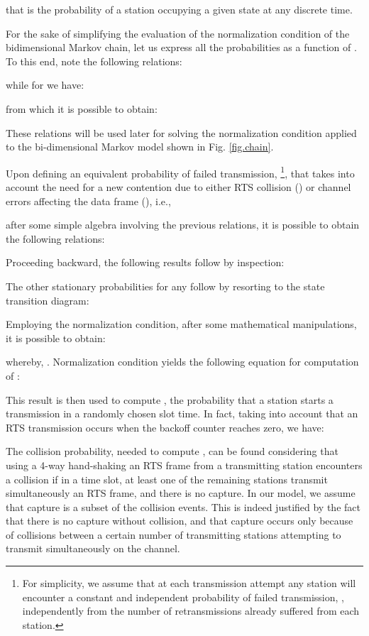 \documentclass[10pt,onecolumn,a4paper]{IEEEtran}
\begin{document}
that is the probability of a station occupying a given state at
any discrete time.

For the sake of simplifying the evaluation of the normalization
condition of the bidimensional Markov chain, let us express all
the probabilities  as a function of . To this
end, note the following relations:

while for  we have:

from which it is possible to obtain:

These relations will be used later for solving the normalization
condition applied to the bi-dimensional Markov model shown in Fig.
\ref{fig.chain}.

Upon defining an equivalent probability of failed transmission,
\footnote{For simplicity, we assume that at each
transmission attempt any station will encounter a constant and
independent probability of failed transmission, ,
independently from the number of retransmissions already suffered
from each station.}, that takes into account the need for a new
contention due to either RTS collision () or channel
errors affecting the data frame (), i.e.,

after some simple algebra involving the previous relations, it is
possible to obtain the following relations:

Proceeding backward, the following results follow by inspection:

The other stationary probabilities for any  follow
by resorting to the state transition diagram:

Employing the normalization condition, after some mathematical
manipulations, it is possible to obtain:

whereby, .
Normalization condition yields the following equation for
computation of :

This result is then used to compute , the probability that a
station starts a transmission in a randomly chosen slot time. In
fact, taking into account that an RTS transmission occurs when the
backoff counter reaches zero, we have:

The collision probability, needed to compute , can be found
considering that using a 4-way hand-shaking an RTS frame from a
transmitting station encounters a collision if in a time slot, at
least one of the remaining  stations transmit
simultaneously an RTS frame, and there is no capture. In our
model, we assume that capture is a subset of the collision events.
This is indeed justified by the fact that there is no capture
without collision, and that capture occurs only because of
collisions between a certain number of transmitting stations
attempting to transmit simultaneously on the channel.
\end{document}
